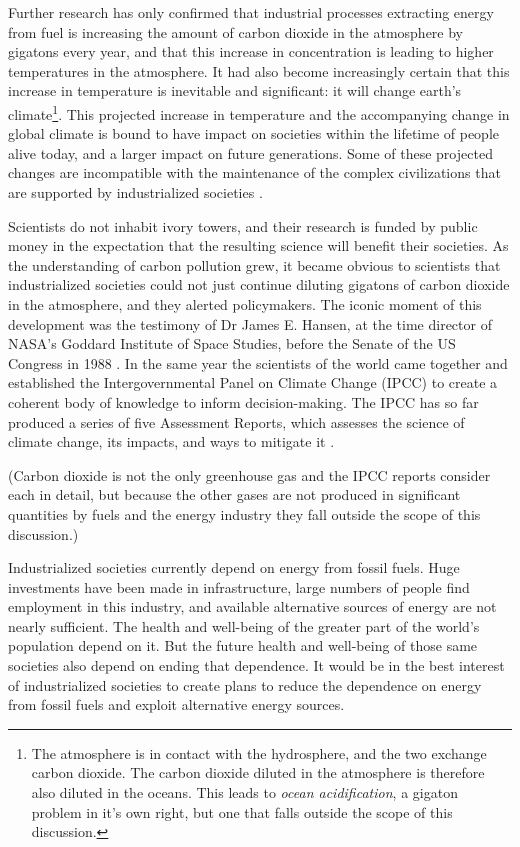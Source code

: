 Further research has only confirmed that industrial processes extracting energy
from fuel is increasing the amount of carbon dioxide in the atmosphere by
gigatons every year, and that this increase in concentration is leading to
higher temperatures in the atmosphere. It had also become increasingly certain
that this increase in temperature is inevitable and significant: it will change
earth's climate\footnote{The atmosphere is in contact with the hydrosphere, and
the two exchange carbon dioxide. The carbon dioxide diluted in the atmosphere is
therefore also diluted in the oceans. This leads to \textit{ocean
acidification}, a gigaton problem in it's own right, but one that falls outside
the scope of this discussion.}. This projected increase in temperature and the
accompanying change in global climate is bound to have impact on societies
within the lifetime of people alive today, and a larger impact on future
generations. Some of these projected changes are incompatible with the
maintenance of the complex civilizations that are supported by industrialized
societies \autocite{IPCC2014}.

Scientists do not inhabit ivory towers, and their research is funded by public
money in the expectation that the resulting science will benefit their
societies. As the understanding of carbon pollution grew, it became obvious to
scientists that industrialized societies could not just continue diluting
gigatons of carbon dioxide in the atmosphere, and they alerted policymakers. The
iconic moment of this development was the testimony of Dr James E. Hansen, at
the time director of NASA's Goddard Institute of Space Studies, before the
Senate of the US Congress in 1988 \autocite{Shabecoff1988}. In the same year the
scientists of the world came together and established the Intergovernmental
Panel on Climate Change (IPCC) to create a coherent body of knowledge to inform
decision-making. The IPCC has so far produced a series of five Assessment
Reports, which assesses the science of climate change, its impacts, and ways to
mitigate it \autocite{Allen2014}.

(Carbon dioxide is not the only greenhouse gas and the IPCC reports consider
each in detail, but because the other gases are not produced in significant
quantities by fuels and the energy industry they fall outside the scope of this
discussion.)

Industrialized societies currently depend on energy from fossil fuels. Huge
investments have been made in infrastructure, large numbers of people find
employment in this industry, and available alternative sources of energy are not
nearly sufficient. The health and well-being of the greater part of the world's
population depend on it. But the future health and well-being of those same
societies also depend on ending that dependence. It would be in the best
interest of industrialized societies to create plans to reduce the dependence on
energy from fossil fuels and exploit alternative energy sources.

